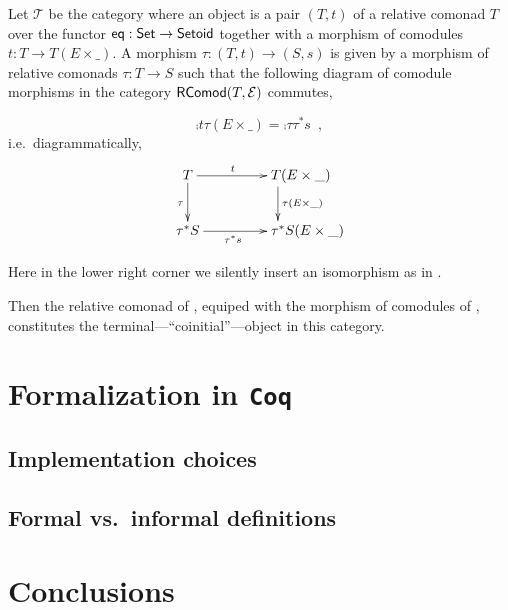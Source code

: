 \documentclass{amsart}
\begin{document}
\begin{example}\label{ex:final_sem_tri}
   Let $\mathcal{T}$ be the category where an object is a pair $(T,t)$ of a relative comonad $T$ over the functor
   $\mathsf{eq}: \mathsf{Set} \to \mathsf{Setoid}$ together with a morphism of comodules $t : T \to T(E \times \_)$.
   A morphism $\tau : (T,t) \to (S,s)$ is given by a morphism of relative comonads $\tau : T \to S$ such that
   the following diagram of comodule morphisms in the category $\mathsf{RComod}(T,\mathcal{E})$ commutes,
   
   \[     \comp{t}{\tau(E\times \_)} = \comp{\tau}{\tau^*s} \enspace , \]
   i.e.\, diagrammatically,   
   \[ \begin{xy}
       \xymatrix{   T  \ar[r]^t \ar[d]_{\tau}  &  **[r]T (E\times \_ )\ar[d]^{\tau(E\times \_)} \\
                    \tau^*S  \ar[r]_{\tau^*s}  &  **[r] \tau^*S (E\times \_ )
        }
      \end{xy}
   \]

   \noindent
   Here in the lower right corner we silently insert an isomorphism as in .
   
   Then the relative comonad of , equiped with the morphism of comodules of ,
   constitutes the terminal---\enquote{coinitial}---object in this category.
   
\end{example}

\section{Formalization in \texttt{Coq}}

\subsection{Implementation choices}


\subsection{Formal vs.\ informal definitions}


\section{Conclusions}



\printbibliography

\appendix


\end{document}
